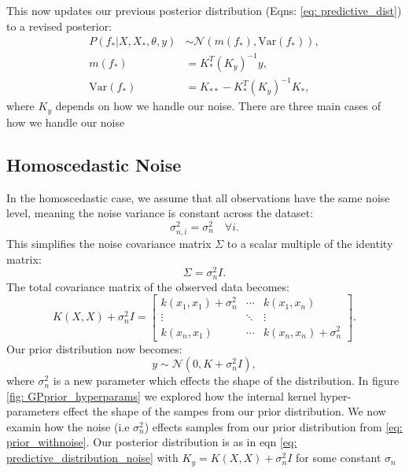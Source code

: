 \documentclass{ucdgradtaughtthesis}
\begin{document}
This now updates our previous posterior distribution (Eqns: \ref{eq: predictive_dist}) to a revised posterior:
%
\begin{subequations}
\begin{align}
    P(f_*|X,X_*,\theta,y) &\sim \mathcal{N}(m(f_*), \text{Var}(f_*)),\\
m(f_*) &= K_*^T (K_y)^{-1} y,
\label{eq: predictive_mean_noise}\\
\text{Var}(f_*) &= K_{**} - K_*^T (K_y)^{-1} K_*,
\label{eq: predictive_variance_noise}
\end{align}
\label{eq: predictive_distribution_noise}
\end{subequations}
%
where \(K_y\) depends on how we handle our noise. There are three main cases of how we handle our noise

\subsection{Homoscedastic Noise} 

In the homoscedastic case, we assume that all observations have the same noise level, meaning the noise variance is constant across the dataset:
\[
\sigma_{n,i}^2 = \sigma_n^2 \quad \forall i.
\]
This simplifies the noise covariance matrix \( \Sigma \) to a scalar multiple of the identity matrix:
\[
\Sigma = \sigma_n^2 I.
\]
The total covariance matrix of the observed data becomes:
\[
K(X, X) + \sigma_n^2 I = 
\begin{bmatrix}
k(x_1, x_1) + \sigma_n^2 & \cdots & k(x_1, x_n) \\
\vdots & \ddots & \vdots \\
k(x_n, x_1) & \cdots & k(x_n, x_n) + \sigma_n^2
\end{bmatrix}.
\]
Our prior distribution now becomes:
\begin{equation}
y \sim \mathcal{N}(0, K+\sigma_n^2 I),
\label{eq: prior_withnoise}
\end{equation}
where $\sigma_n^2$ is a new parameter which effects the shape of the distribution. In figure \ref{fig: GPprior_hyperparams} we 
explored how the internal kernel hyper-parameters effect the shape of the sampes from our prior distribution. We now examin how the noise (i.e $\sigma_n^2$) effects samples from our prior distribution from \ref{eq: prior_withnoise}.
Our posterior distribution is as in eqn \ref{eq:  predictive_distribution_noise} with \(K_y = K(X, X) + \sigma_n^2 I \) for some constant \(\sigma_n\)
\end{document}
